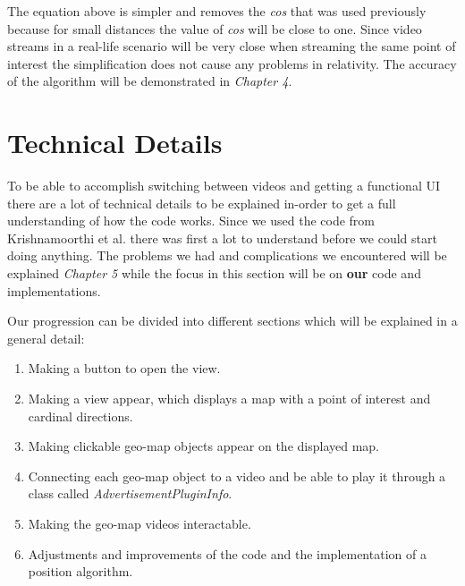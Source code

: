 The equation above is simpler and removes the \textit{cos} that was used previously because for small distances the value of \textit{cos} will be close to one. Since video streams in a real-life scenario will be very close when streaming the same point of interest the simplification does not cause any problems in relativity. The accuracy of the algorithm will be demonstrated in \textit{Chapter 4}.

\section{Technical Details}
\label{sec:technicaldetails}

To be able to accomplish switching between videos and getting a functional UI there are a lot of technical details to be explained in-order to get a full understanding of how the code works. Since we used the code from Krishnamoorthi et al. \cite{qualbranch} there was first a lot to understand before we could start doing anything. The problems we had and complications we encountered will be explained \textit{Chapter 5} while the focus in this section will be on \textbf{our} code and implementations. 

Our progression can be divided into different sections which will be explained in a general detail:

\begin{enumerate}
\item Making a button to open the view.

\item Making a view appear, which displays a map with a point of interest and cardinal directions.

\item Making clickable geo-map objects appear on the displayed map.

\item Connecting each geo-map object to a video and be able to play it through a class called \textit{AdvertisementPluginInfo}.

\item Making the geo-map videos interactable.


\item Adjustments and improvements of the code and the implementation of a position algorithm. 
\end{enumerate}

